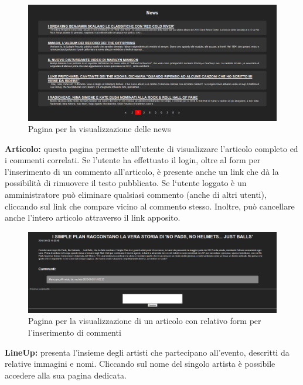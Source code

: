 \documentclass[10pt, a4paper]{article}
\begin{document}
\newpage
\begin{figure}[h!]
  \centering
  \includegraphics[width=1\textwidth]{Images/news.png}
  \caption{Pagina per la visualizzazione delle news}
  \label{fig:news}
\end{figure}
\begin{flushleft} \textbf{Articolo: }questa pagina permette all’utente di visualizzare l’articolo completo ed i commenti correlati.
Se l’utente ha effettuato il login, oltre al form per l’inserimento di un commento all’articolo, è presente anche un link che dà la possibilità di rimuovere il testo pubblicato. 
Se l‘utente loggato è un amministratore può eliminare qualsiasi commento (anche di altri utenti), cliccando sul link che compare vicino al commento stesso. Inoltre, può cancellare anche l’intero articolo attraverso il link apposito. \end{flushleft}
\begin{figure}[h!]
  \centering
  \includegraphics[width=1\textwidth]{Images/articolo.png}
  \caption{Pagina per la visualizzazione di un articolo con relativo form per l'inserimento di commenti}
  \label{fig:articolo}
\end{figure}
\newpage
\begin{flushleft} \textbf{LineUp: }presenta l'insieme degli artisti che partecipano all'evento, descritti da relative immagini e nomi. Cliccando sul nome del singolo artista è possibile accedere alla sua pagina dedicata. \end{flushleft}
\end{document}
